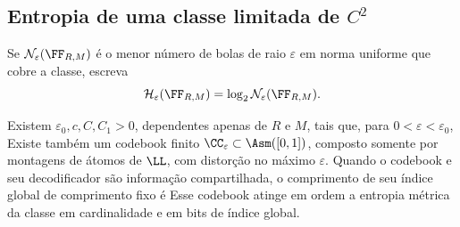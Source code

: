 \subsection{Entropia de uma classe limitada de \texorpdfstring{$C^2$}{C2}}
Se $\mathcal N_\varepsilon(\FF_{R,M})$ é o menor número de bolas de raio $\varepsilon$ em norma uniforme que cobre a classe, escreva
\[
\mathcal H_\varepsilon(\FF_{R,M})=\log_2\mathcal N_\varepsilon(\FF_{R,M}).
\]
\begin{teorema}
Existem $\varepsilon_0,c,C,C_1>0$, dependentes apenas de $R$ e $M$, tais que, para $0<\varepsilon<\varepsilon_0$,
Existe também um codebook finito $\CC_\varepsilon\subset\Asm([0,1])$, composto somente por montagens de átomos de $\LL$, com distorção no máximo $\varepsilon$. Quando o codebook e seu decodificador são informação compartilhada, o comprimento de seu índice global de comprimento fixo é
Esse codebook atinge em ordem a entropia métrica da classe em cardinalidade e em bits de índice global.
\end{teorema}

